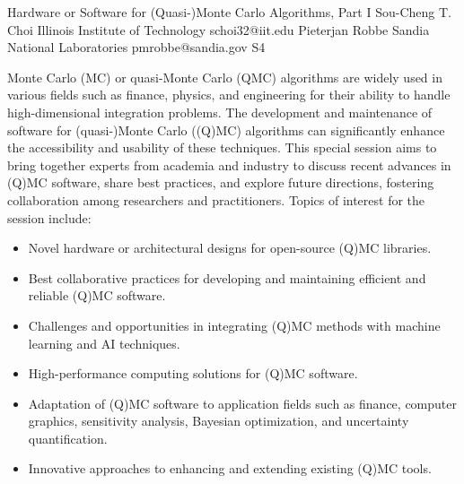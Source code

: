 

\clearpage

\begin{session}
 {Hardware or Software for (Quasi-)Monte Carlo Algorithms, Part I}%
 {Sou-Cheng T.  Choi}%
 {Illinois Institute of Technology}%
 {schoi32@iit.edu}%
 {Pieterjan Robbe}%
 {Sandia National Laboratories}%
 {pmrobbe@sandia.gov}%
 {S4}%
 {}%

 Monte Carlo (MC) or quasi-Monte Carlo (QMC) algorithms are widely used in various fields such as finance, physics, and engineering for their ability to handle high-dimensional integration problems. The development and maintenance of software for (quasi-)Monte Carlo ((Q)MC) algorithms can significantly enhance the accessibility and usability of these techniques. This special session aims to bring together experts from academia and industry to discuss recent advances in (Q)MC software, share best practices, and explore future directions, fostering collaboration among researchers and practitioners.
 Topics of interest for the session include:
 \begin{itemize}
 \item Novel hardware or architectural designs for open-source (Q)MC libraries.
 \item Best collaborative practices for developing and maintaining efficient and reliable (Q)MC software.
 \item Challenges and opportunities in integrating (Q)MC methods with machine learning and AI techniques.
 \item High-performance computing solutions for (Q)MC software.
 \item Adaptation of (Q)MC software to application fields such as finance, computer graphics, sensitivity analysis, Bayesian optimization, and uncertainty quantification.
 \item Innovative approaches to enhancing and extending existing (Q)MC tools.
 \end{itemize}
\end{session}

